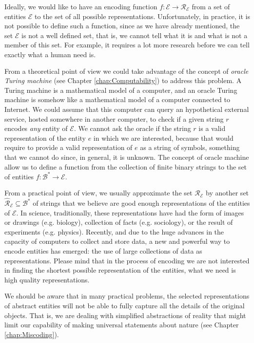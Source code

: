 Ideally, we would like to have an encoding function $f:\mathcal{E} \rightarrow \mathcal{R_\mathcal{E}}$ from a set of entities $\mathcal{E}$ to the set of all possible representations. Unfortunately, in practice, it is not possible to define such a function, since as we have already mentioned, the set $\mathcal{E}$ is not a well defined set, that is, we cannot tell what it is and what is not a member of this set. For example, it requires a lot more research before we can tell exactly what a human need is.

From a theoretical point of view we could take advantage of the concept of \emph{oracle Turing machine} (see Chapter \ref{chap:Computability}) to address this problem. A Turing machine is a mathematical model of a computer, and an oracle Turing machine is somehow like a mathematical model of a computer connected to Internet. We could assume that this computer can query an hypothetical external service, hosted somewhere in another computer, to check if a given string $r$ encodes \emph{any} entity of $\mathcal{E}$. We cannot ask the oracle if the string $r$ is a valid representation of the entity $e$ in which we are interested, because that would require to provide a valid representation of $e$ as a string of symbols, something that we cannot do since, in general, it is unknown. The concept of oracle machine allow us to define a function from the collection of finite binary strings to the set of entities $f:\mathcal{B}^\ast \rightarrow \mathcal{E}$.

From a practical point of view, we usually approximate the set $\mathcal{R}_\mathcal{E}$ by another set $\hat{\mathcal{R}}_\mathcal{E} \subseteq \mathcal{B}^\ast$ of strings that we believe are good enough representations of the entities of $\mathcal{E}$. In science, traditionally, these representations have had the form of images or drawings (e.g. biology), collection of facts (e.g. sociology), or the result of experiments (e.g. physics). Recently, and due to the huge advances in the capacity of computers to collect and store data, a new and powerful way to encode entities has emerged: the use of large collections of data as representations. Please mind that in the process of encoding we are not interested in finding the shortest possible representation of the entities, what we need is high quality representations.

We should be aware that in many practical problems, the selected representations of abstract entities will not be able to fully capture all the details of the original objects. That is, we are dealing with simplified abstractions of reality that might limit our capability of making universal statements about nature (see Chapter \ref{chap:Miscoding}).

